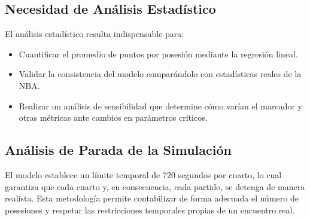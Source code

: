 \documentclass[12pt]{article}
\begin{document}
\subsection{Necesidad de Análisis Estadístico}
El análisis estadístico resulta indispensable para:
\begin{itemize}
    \item Cuantificar el promedio de puntos por posesión mediante la regresión lineal.
    \item Validar la consistencia del modelo comparándolo con estadísticas reales de la NBA.
    \item Realizar un análisis de sensibilidad que determine cómo varían el marcador y otras métricas ante cambios en parámetros críticos.
\end{itemize}

\subsection{Análisis de Parada de la Simulación}
El modelo establece un límite temporal de 720 segundos por cuarto, lo cual garantiza que cada cuarto y, en consecuencia, cada partido, se detenga de manera realista. Esta metodología permite contabilizar de forma adecuada el número de posesiones y respetar las restricciones temporales propias de un encuentro real.

\newpage
\end{document}
